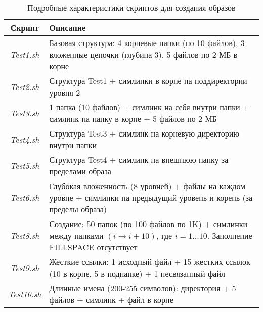 \begin{table}[htbp]
	\renewcommand{\arraystretch}{1.5}
	\centering
	\begin{tabular}{|c|p{10cm}|}
		\hline
		\textbf{Скрипт} & \textbf{Описание} \\
		\hline
		\textit{Test1.sh} & Базовая структура: 4 корневые папки (по 10 файлов), 3 вложенные цепочки (глубина 3), 5 файлов по 2 МБ в корне\\
        \hline
        \textit{Test2.sh} & Структура Test1 + симлинки в корне на поддиректории уровня 2\\
        \hline
        \textit{Test3.sh} & 1 папка (10 файлов) + симлинк на себя внутри папки + симлинк на папку в корне + 5 файлов по 2 МБ\\
        \hline
        \textit{Test4.sh} & Структура Test3 + симлинк на корневую директорию внутри папки \\
        \hline
        \textit{Test5.sh} & Структура Test4 + симлинк на внешнюю папку за пределами образа \\
        \hline
        \textit{Test6.sh} & Глубокая вложенность (8 уровней) + файлы на каждом уровне + симлинки на предыдущий уровень и корень (за пределы образа) \\
        \hline
        \textit{Test8.sh} & Создание: 50 папок (по 100 файлов по 1K) + симлинки между папками $(i → i+10)$, где $i=1...10$. Заполнение FILLSPACE отсутствует\\
        \hline
        \textit{Test9.sh} & Жесткие ссылки: 1 исходный файл + 15 жестких ссылок (10 в корне, 5 в подпапке) + 1 несвязанный файл\\
        \hline
        \textit{Test10.sh} & Длинные имена (200-255 символов): директория + 5 файлов + симлинк + файл в корне\\
        \hline
	\end{tabular}
	\caption{Подробные характеристики скриптов для создания образов}
	\label{ext:tab:test_detail}
\end{table}

\newpage
